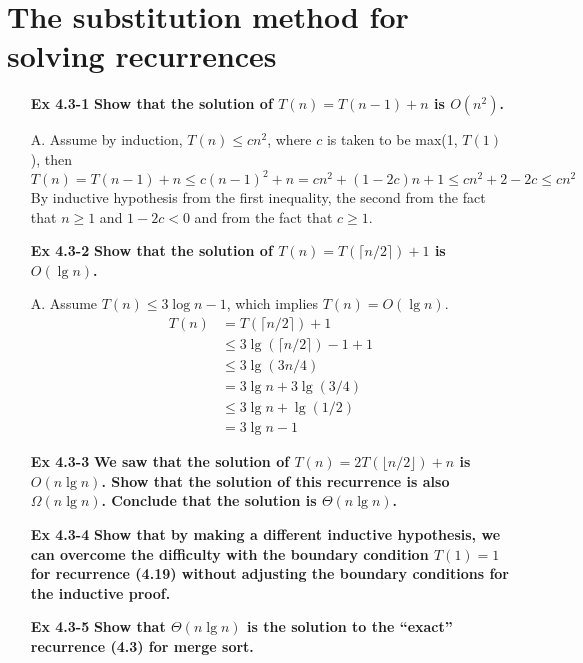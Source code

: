 \documentclass[fontsize=12pt,paper=a4,open=any]{book}
\begin{document}
\section{The substitution method for solving recurrences}
\begin{enumerate}
	\item[\textbf{Ex 4.3-1}]
		\textbf{Show that the solution of $T(n) = T(n-1)+n$ is $O(n^2)$.}
	\item[A.]
	Assume by induction, $T(n) \leq cn^2$, where $c$ is taken to be max(1, $T(1)$), then
	\[ T(n) = T(n-1) + n \leq c(n-1)^2 + n = cn^2 + (1-2c)n + 1 \leq cn^2 + 2 - 2c \leq cn^2 \]
By inductive hypothesis from the first inequality, the second from the fact that $n \geq 1$ and $1-2c<0$ and from the fact that $c \geq 1$.

	\item[\textbf{Ex 4.3-2}]
		\textbf{Show that the solution of $T(n) = T(\lceil n/2 \rceil) + 1$ is $O(\lg n)$.}
	\item[A.]
	Assume $T(n) \leq 3\log n - 1$, which implies $T(n) = O(\lg n)$.
	\begin{equation*}
		\begin{split}
			T(n) & = T(\lceil n/2 \rceil) + 1 \\
			& \leq 3 \lg(\lceil n/2 \rceil) -1 + 1 \\
			& \leq 3 \lg(3n/4)\\
			& = 3\lg n + 3\lg(3/4)\\
			& \leq 3\lg n + \lg(1/2)\\
			& = 3\lg n - 1
		\end{split}
	\end{equation*}
	
	\item[\textbf{Ex 4.3-3}]
		\textbf{We saw that the solution of $T(n) = 2T(\lfloor n/2 \rfloor) + n$ is $O(n \lg n)$. Show that the solution of this recurrence is also $\Omega(n \lg n)$. Conclude that the solution is $\Theta(n \lg n)$.}
		
	\item[\textbf{Ex 4.3-4}]
		\textbf{Show that by making a different inductive hypothesis, we can overcome the difficulty with the boundary condition $T(1) = 1$ for recurrence (4.19) without adjusting the boundary conditions for the inductive proof.}
		
	\item[\textbf{Ex 4.3-5}]
		\textbf{Show that $\Theta(n \lg n)$ is the solution to the “exact” recurrence (4.3) for merge sort.}
		

\end{enumerate}
\end{document}
